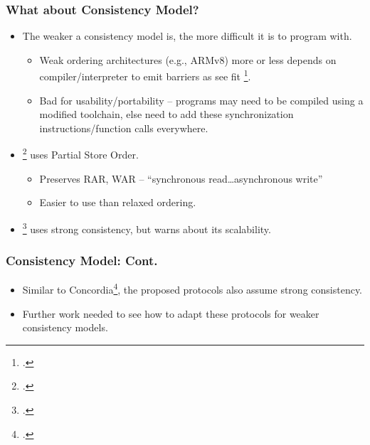 \documentclass{beamer}
\begin{document}
\begin{frame}
    \frametitle{What about Consistency \textbf{Model}?}
    \begin{itemize}
        \item {
            The weaker a consistency model is, the more difficult it is to program with.
            \begin{itemize}
                \item {
                    Weak ordering architectures (e.g., ARMv8) more or less depends on
                    compiler/interpreter to emit barriers as see fit \footcite{Haynes_2022}.
                }
                \item {
                    Bad for usability/portability -- programs may need
                    to be compiled using a modified toolchain, else need to add these
                    synchronization instructions/function calls everywhere.
                }
            \end{itemize}
        }
        \item {
            \footcite{cai2018efficient} uses Partial Store Order.
            \begin{itemize}
                \item Preserves RAR, WAR -- ``synchronous read\dots asynchronous write''
                \item Easier to use than relaxed ordering.
            \end{itemize}
        }
        \item {
            \footcite{wang2021concordia} uses strong consistency, but warns about its scalability.
        }
    \end{itemize}
\end{frame}

\begin{frame}
    \frametitle{Consistency Model: Cont.}
    \begin{itemize}
        \item {
            Similar to Concordia\footcite{wang2021concordia}, the proposed protocols also assume
            strong consistency.
        }
        \item {
            Further work needed to see how to adapt these protocols for weaker consistency models.
        }
    \end{itemize}
\end{frame}
\end{document}
